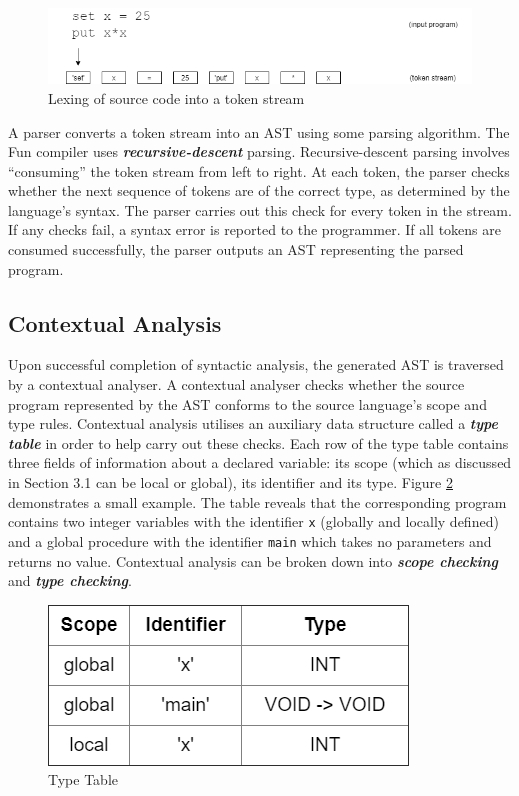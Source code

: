 \documentclass{l4proj}
\begin{document}
\begin{figure}[h]
\centering
\includegraphics[scale=0.5]{images/token_stream.png}
\caption{Lexing of source code into a token stream}
\label{fig:token-stream}	
\end{figure}

A parser converts a token stream into an AST using some parsing algorithm. The Fun compiler uses \textit{\textbf{recursive-descent}} parsing. Recursive-descent parsing involves ``consuming'' the token stream from left to right. At each token, the parser checks whether the next sequence of tokens are of the correct type, as determined by the language's syntax. The parser carries out this check for every token in the stream. If any checks fail, a syntax error is reported to the programmer. If all tokens are consumed successfully, the parser outputs an AST representing the parsed program.

\subsection{Contextual Analysis}
Upon successful completion of syntactic analysis, the generated AST is traversed  by a contextual analyser. A contextual analyser checks whether the source program represented by the AST conforms to the source language's scope and type rules. Contextual analysis utilises an auxiliary data structure called a \textit{\textbf{type table}} in order to help carry out these checks. Each row of the type table contains three fields of information about a declared variable: its scope (which as discussed in Section 3.1 can be local or global), its identifier and its type. Figure \ref{fig:type-table} demonstrates a small example. The table reveals that the corresponding program contains two integer variables with the identifier \texttt{x} (globally and locally defined) and a global procedure with the identifier \texttt{main} which takes no parameters and returns no value. Contextual analysis can be broken down into \textit{\textbf{scope checking}} and \textit{\textbf{type checking}}.

\begin{figure}[h]
\centering
\includegraphics[scale=0.5]{images/type-table.png}
\caption{Type Table}
\label{fig:type-table}	
\end{figure}
\end{document}
